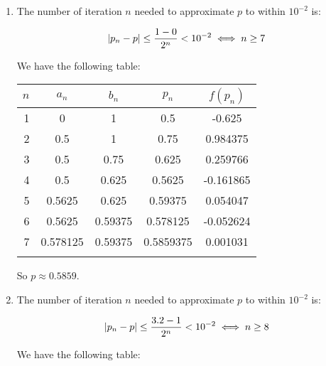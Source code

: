\documentclass[../../Assignments.tex]{subfiles}
\begin{document}
\begin{solution}
    \begin{enumerate}[label=(\alph*)]
        \item The number of iteration \(n\) needed to approximate \(p\) to
            within \(10^{-2}\) is:

            \[\abs{p_n - p} \leq \frac{1 - 0}{2^n} < 10^{-2} \iff n \geq 7\]

            We have the following table:

            \begin{tabular}{r S[table-format=1.6] S[table-format=1.5] S[table-format=1.7] S[table-format=-1.6]}
                \\
                \toprule
                \(n\)  &  {\(a_n\)}  &  {\(b_n\)}  &  {\(p_n\)}  &  {\(f(p_n)\)}  \\
                  &  0          &  1          &  0.5        &  -0.625        \\
                    2  &  0.5        &  1          &  0.75       &   0.984375     \\
                    3  &  0.5        &  0.75       &  0.625      &   0.259766     \\
                    4  &  0.5        &  0.625      &  0.5625     &  -0.161865     \\
                    5  &  0.5625     &  0.625      &  0.59375    &   0.054047     \\
                    6  &  0.5625     &  0.59375    &  0.578125   &  -0.052624     \\
                    7  &  0.578125   &  0.59375    &  0.5859375  &   0.001031     \\
                \bottomrule
                \\
            \end{tabular}

            So \(p \approx \num{0.5859}\).

        \item The number of iteration \(n\) needed to approximate \(p\) to
            within \(10^{-2}\) is:

            \[\abs{p_n - p} \leq \frac{\num{3.2} - 1}{2^n} < 10^{-2} \iff n \geq 8\]

            We have the following table:


\end{enumerate}
\end{solution}
\end{document}
